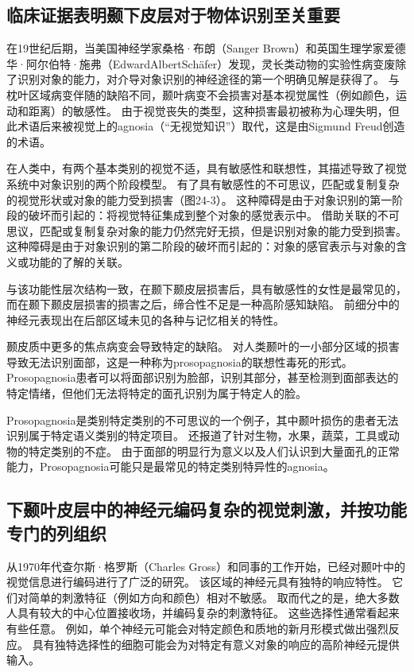 \subsection{临床证据表明颞下皮层对于物体识别至关重要}
在19世纪后期，当美国神经学家桑格·布朗（Sanger Brown）和英国生理学家爱德华·阿尔伯特·施弗（EdwardAlbertSchäfer）发现，灵长类动物的实验性病变废除了识别对象的能力，对介导对象识别的神经途径的第一个明确见解是获得了。 与枕叶区域病变伴随的缺陷不同，颞叶病变不会损害对基本视觉属性（例如颜色，运动和距离）的敏感性。 由于视觉丧失的类型，这种损害最初被称为心理失明，但此术语后来被视觉上的agnosia（“无视觉知识”）取代，这是由Sigmund Freud创造的术语。

在人类中，有两个基本类别的视觉不适，具有敏感性和联想性，其描述导致了视觉系统中对象识别的两个阶段模型。 有了具有敏感性的不可思议，匹配或复制复杂的视觉形状或对象的能力受到损害（图24-3）。 这种障碍是由于对象识别的第一阶段的破坏而引起的：将视觉特征集成到整个对象的感觉表示中。 借助关联的不可思议，匹配或复制复杂对象的能力仍然完好无损，但是识别对象的能力受到损害。 这种障碍是由于对象识别的第二阶段的破坏而引起的：对象的感官表示与对象的含义或功能的了解的关联。

与该功能性层次结构一致，在颞下颞皮层损害后，具有敏感性的女性是最常见的，而在颞下颞皮层损害的损害之后，缔合性不足是一种高阶感知缺陷。 前细分中的神经元表现出在后部区域未见的各种与记忆相关的特性。

颞皮质中更多的焦点病变会导致特定的缺陷。 对人类颞叶的一小部分区域的损害导致无法识别面部，这是一种称为prosopagnosia的联想性毒死的形式。 Prosopagnosia患者可以将面部识别为脸部，识别其部分，甚至检测到面部表达的特定情绪，但他们无法将特定的面孔识别为属于特定人的脸。

Prosopagnosia是类别特定类别的不可思议的一个例子，其中颞叶损伤的患者无法识别属于特定语义类别的特定项目。 还报道了针对生物，水果，蔬菜，工具或动物的特定类别的不症。 由于面部的明显行为意义以及人们认识到大量面孔的正常能力，Prosopagnosia可能只是最常见的特定类别特异性的agnosia。

\subsection{下颞叶皮层中的神经元编码复杂的视觉刺激，并按功能专门的列组织}
从1970年代查尔斯·格罗斯（Charles Gross）和同事的工作开始，已经对颞叶中的视觉信息进行编码进行了广泛的研究。 该区域的神经元具有独特的响应特性。 它们对简单的刺激特征（例如方向和颜色）相对不敏感。 取而代之的是，绝大多数人具有较大的中心位置接收场，并编码复杂的刺激特征。 这些选择性通常看起来有些任意。 例如，单个神经元可能会对特定颜色和质地的新月形模式做出强烈反应。 具有独特选择性的细胞可能会为对特定有意义对象的响应的高阶神经元提供输入。

